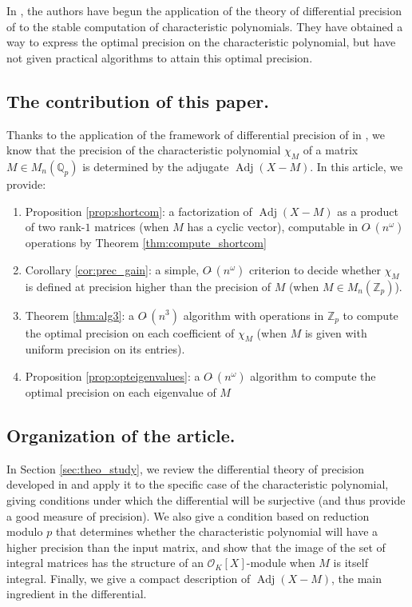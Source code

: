 \documentclass{sig-alternate-05-2015}
\DeclareMathOperator{\adj}{Adj}
\newcommand{\Z}{\mathbb Z}
\newcommand{\Zp}{\Z_p}
\newcommand{\OK}{\mathcal{O}_K}
\newcommand{\softO}{O\tilde{~}}
\begin{document}
In \cite{caruso-roe-vaccon:15a}, the authors have begun the application
of the theory of differential precision of \cite{caruso-roe-vaccon:14a}
to the stable computation of characteristic polynomials.
They have obtained a way to express the optimal precision
on the characteristic polynomial, but have not given practical algorithms
to attain this optimal precision.

\subsection*{The contribution of this paper.}

Thanks to the application of the framework of differential precision
of \cite{caruso-roe-vaccon:14a} in \cite{caruso-roe-vaccon:15a},
we know that the precision of the characteristic polynomial
$\chi_M$ of a matrix $M \in M_n(\mathbb{Q}_p)$
is determined by the adjugate $\adj(X -M).$
In this article, we provide:
\begin{enumerate}
\renewcommand{\itemsep}{0pt}
\item Proposition \ref{prop:shortcom}: a factorization of $\adj(X -M)$
as a product of two rank-$1$ matrices (when $M$ has a cyclic vector),
computable in $\softO(n^\omega)$ operations by Theorem \ref{thm:compute_shortcom}
\item Corollary \ref{cor:prec_gain}: a simple, $\softO(n^\omega)$ criterion
to decide whether $\chi_M$ is defined at precision
higher than the precision of $M$ (when $M \in M_n(\mathbb{Z}_p)$).
\item Theorem \ref{thm:alg3}: a $\softO(n^3)$ algorithm with operations in $\Zp$
to compute the optimal precision on each coefficient of $\chi_M$ (when $M$
is given with uniform precision on its entries).
\item Proposition \ref{prop:opteigenvalues}: a $\softO(n^\omega)$
algorithm to compute the optimal precision on each eigenvalue of $M$
\end{enumerate}


\subsection*{Organization of the article.}

In Section \ref{sec:theo_study}, we review the differential
theory of precision developed in \cite{caruso-roe-vaccon:14a}
and apply it to the specific case of the characteristic polynomial,
giving conditions under which the differential will be surjective
(and thus provide a good measure of precision).  We also give
a condition based on reduction modulo $p$ that determines
whether the characteristic polynomial will have a higher
precision than the input matrix, and show that the image
of the set of integral matrices has the structure of an $\OK[X]$-module
when $M$ is itself integral. Finally, we give a compact description
of $\adj(X-M)$, the main ingredient in the differential.
\end{document}
